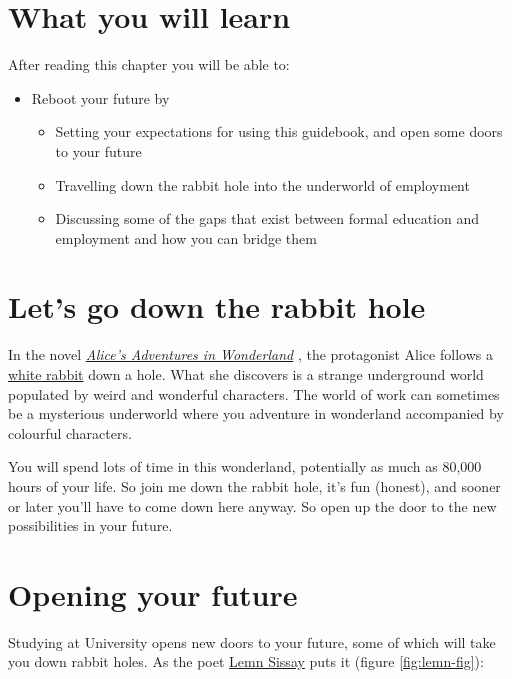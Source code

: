\documentclass[
]{book}
\providecommand{\tightlist}{%
  \setlength{\itemsep}{0pt}\setlength{\parskip}{0pt}}
\begin{document}
\hypertarget{ilo1}{%
\section{What you will learn}\label{ilo1}}

After reading this chapter you will be able to:

\begin{itemize}
\tightlist
\item
  Reboot your future by

  \begin{itemize}
  \tightlist
  \item
    Setting your expectations for using this guidebook, and open some doors to your future
  \item
    Travelling down the rabbit hole into the underworld of employment
  \item
    Discussing some of the gaps that exist between formal education and employment and how you can bridge them
  \end{itemize}
\end{itemize}

\hypertarget{wonderland}{%
\section{Let's go down the rabbit hole}\label{wonderland}}

In the novel \emph{\href{https://en.wikipedia.org/wiki/Alice\%27s_Adventures_in_Wonderland}{Alice's Adventures in Wonderland}} \citep{wonderland}, the protagonist Alice follows a \href{https://en.wikipedia.org/wiki/White_Rabbit}{white rabbit} down a hole. What she discovers is a strange underground world populated by weird and wonderful characters. The world of work can sometimes be a mysterious underworld where you adventure in wonderland accompanied by colourful characters.

You will spend lots of time in this wonderland, potentially as much as 80,000 hours of your life. \citep{iip1, iip2} So join me down the rabbit hole, it's fun (honest), and sooner or later you'll have to come down here anyway. So open up the door to the new possibilities in your future.

\hypertarget{opening}{%
\section{Opening your future}\label{opening}}

Studying at University opens new doors to your future, some of which will take you down rabbit holes. As the poet \href{https://en.wikipedia.org/wiki/Lemn_Sissay}{Lemn Sissay} puts it (figure \ref{fig:lemn-fig}):
\end{document}
